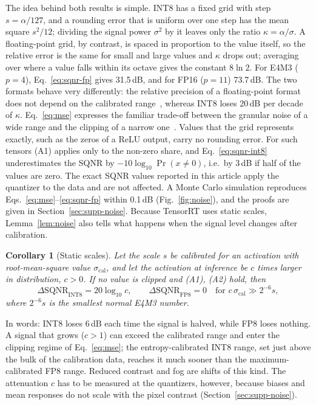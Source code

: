 \documentclass[pdflatex,sn-mathphys-num]{sn-jnl}%
\theoremstyle{thmstyleone}%
\newtheorem{corollary}[theorem]{Corollary}%
\theoremstyle{thmstyletwo}%
\theoremstyle{thmstylethree}%
\begin{document}
The idea behind both results is simple. INT8 has a fixed grid with step $s=\alpha/127$, and a rounding error that is uniform over one step has the mean square $s^2/12$; dividing the signal power $\sigma^2$ by it leaves only the ratio $\kappa=\alpha/\sigma$. A floating-point grid, by contrast, is spaced in proportion to the value itself, so the relative error is the same for small and large values and $\kappa$ drops out; averaging over where a value falls within its octave gives the constant $8\ln2$. For E4M3 ($p=4$), Eq.~\eqref{eq:sqnr-fp} gives 31.5\,dB, and for FP16 ($p=11$) 73.7\,dB. The two formats behave very differently: the relative precision of a floating-point format does not depend on the calibrated range~\cite{kuzmin2022fp8,vanbaalen2023fp8}, whereas INT8 loses 20\,dB per decade of $\kappa$. Eq.~\eqref{eq:mse} expresses the familiar trade-off between the granular noise of a wide range and the clipping of a narrow one~\cite{banner2019aciq,zhao2019ocs}. Values that the grid represents exactly, such as the zeros of a ReLU output, carry no rounding error. For such tensors (A1) applies only to the non-zero share, and Eq.~\eqref{eq:sqnr-int8} underestimates the SQNR by $-10\log_{10}\Pr(x\neq0)$, i.e.\ by 3\,dB if half of the values are zero. The exact SQNR values reported in this article apply the quantizer to the data and are not affected. A Monte Carlo simulation reproduces Eqs.~\eqref{eq:mse}--\eqref{eq:sqnr-fp} within 0.1\,dB (Fig.~\ref{fig:noise}), and the proofs are given in Section~\ref{sec:supp-noise}. Because TensorRT uses static scales, Lemma~\ref{lem:noise} also tells what happens when the signal level changes after calibration.
\begin{corollary}[Static scales]\label{cor:static}
Let the scale $s$ be calibrated for an activation with root-mean-square value $\sigma_\mathrm{cal}$, and let the activation at inference be $c$ times larger in distribution, $c>0$. If no value is clipped and (A1), (A2) hold, then
\begin{equation}
\Delta\mathrm{SQNR}_\mathrm{INT8}=20\log_{10}c,\qquad\Delta\mathrm{SQNR}_\mathrm{FP8}=0\quad\text{for }c\,\sigma_\mathrm{cal}\gg2^{-6}s,\label{eq:static}
\end{equation}
where $2^{-6}s$ is the smallest normal E4M3 number.
\end{corollary}
In words: INT8 loses 6\,dB each time the signal is halved, while FP8 loses nothing. A signal that grows ($c>1$) can exceed the calibrated range and enter the clipping regime of Eq.~\eqref{eq:mse}; the entropy-calibrated INT8 range, set just above the bulk of the calibration data, reaches it much sooner than the maximum-calibrated FP8 range. Reduced contrast and fog are shifts of this kind. The attenuation $c$ has to be measured at the quantizers, however, because biases and mean responses do not scale with the pixel contrast (Section~\ref{sec:supp-noise}).
\end{document}
